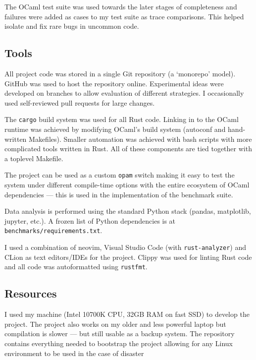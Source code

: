The OCaml test suite was used towards the later stages of completeness and failures were added as
cases to my test suite as trace comparisons. This helped isolate and fix rare bugs in uncommon
code.


\subsection{Tools}

All project code was stored in a single Git repository (a `monorepo' model). GitHub was used to
host the repository online. Experimental ideas were developed on
branches to allow evaluation of different
strategies. I occasionally used self-reviewed pull requests for large changes.


The \texttt{cargo} build system was used for all Rust code. Linking in to the OCaml runtime was
achieved by modifying OCaml's build system (autoconf and hand-written Makefiles). Smaller
automation was achieved with bash scripts with more complicated tools written in Rust.	All of
these components are tied together with a toplevel Makefile.

The project can be used as a custom \texttt{opam} switch making it easy to test the system under
different compile-time options with the entire ecosystem of OCaml dependencies --- this is used in
the implementation of the benchmark suite.

Data analysis is performed using the standard Python stack (pandas, matplotlib, jupyter, etc.). A
frozen
list of Python dependencies is at \texttt{benchmarks/requirements.txt}.

I used a combination of neovim, Visual Studio Code (with \texttt{rust-analyzer}) and CLion as text
editors/IDEs for the project.  Clippy was used for linting Rust code and all code was autoformatted
using \texttt{rustfmt}.

\subsection{Resources}

I used my machine (Intel 10700K CPU, 32GB RAM on fast SSD) to develop the project. The project also
works on my older and less powerful laptop but compilation is slower --- but still usable as a
backup system. The repository contains everything needed to bootstrap the project allowing for any
Linux environment to be used in the case of disaster